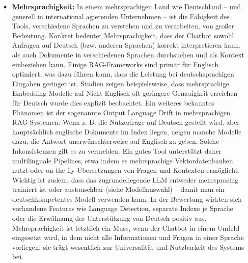 \begin{itemize}
    \item \textbf{Mehrsprachigkeit:} In einem mehrsprachigen Land wie Deutschland – und generell in international agierenden Unternehmen – ist die Fähigkeit des Tools, verschiedene Sprachen zu verstehen und zu verarbeiten, von großer Bedeutung. Konkret bedeutet Mehrsprachigkeit, dass der Chatbot sowohl Anfragen auf Deutsch (bzw. anderen Sprachen) korrekt interpretieren kann, als auch Dokumente in verschiedenen Sprachen durchsuchen und als Kontext einbeziehen kann. Einige RAG-Frameworks sind primär für Englisch optimiert, was dazu führen kann, dass die Leistung bei deutschsprachigen Eingaben geringer ist. Studien zeigen beispielsweise, dass mehrsprachige Embedding-Modelle auf Nicht-Englisch oft geringere Genauigkeit erreichen – für Deutsch wurde dies explizit beobachtet. Ein weiteres bekanntes Phänomen ist der sogenannte Output Language Drift in mehrsprachigen RAG-Systemen: Wenn z. B. die Nutzerfrage auf Deutsch gestellt wird, aber hauptsächlich englische Dokumente im Index liegen, neigen manche Modelle dazu, die Antwort unerwünschterweise auf Englisch zu geben. Solche Inkonsistenzen gilt es zu vermeiden. Ein gutes Tool unterstützt daher multilinguale Pipelines, etwa indem es mehrsprachige Vektordatenbanken nutzt oder on-the-fly-Übersetzungen von Fragen und Kontexten ermöglicht. Wichtig ist zudem, dass das zugrundeliegende LLM entweder mehrsprachig trainiert ist oder austauschbar (siehe Modellauswahl) – damit man ein deutschkompetentes Modell verwenden kann. In der Bewertung wirkten sich vorhandene Features wie Language Detection, separate Indexe je Sprache oder die Erwähnung der Unterstützung von Deutsch positiv aus. Mehrsprachigkeit ist letztlich ein Muss, wenn der Chatbot in einem Umfeld eingesetzt wird, in dem nicht alle Informationen und Fragen in einer Sprache vorliegen; sie trägt wesentlich zur Universalität und Nutzbarkeit des Systems bei.

\end{itemize}
